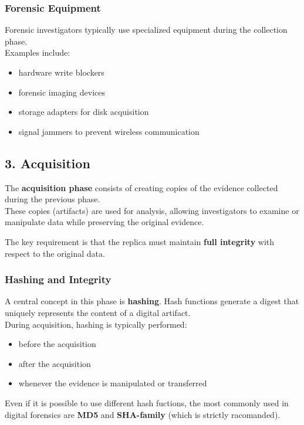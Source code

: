 \subsubsection*{Forensic Equipment}

Forensic investigators typically use specialized equipment during the collection phase.\\
Examples include:

\begin{itemize}
\item hardware write blockers
\item forensic imaging devices
\item storage adapters for disk acquisition
\item signal jammers to prevent wireless communication
\end{itemize}


\subsection{ 3. Acquisition}

The \textbf{acquisition phase} consists of creating copies of the evidence collected during the previous phase.\\ 
These copies (artifacts) are used for analysis, allowing investigators to examine or manipulate data while preserving the original evidence.
\medskip

\noindent
The key requirement is that the replica must maintain \textbf{full integrity} with respect to the original data.

\subsubsection{Hashing and Integrity}

A central concept in this phase is \textbf{hashing}.  
Hash functions generate a digest that uniquely represents the content of a digital artifact.\\
During acquisition, hashing is typically performed:

\begin{itemize}
\item before the acquisition
\item after the acquisition
\item whenever the evidence is manipulated or transferred
\end{itemize}

\noindent
Even if it is possible to use different hash fuctions, the most commonly used in digital forensics are \textbf{MD5} and \textbf{SHA-family} (which is strictly racomanded).

